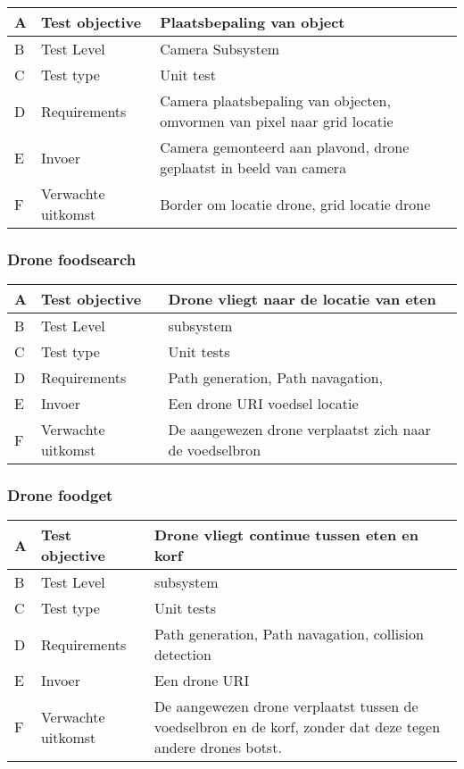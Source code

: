 \begin{table}[hbt!]
    \begin{tabular}[t]{|m{0.3cm}|m{3.2cm}|m{7.5cm}|}\hline
    A & Test objective & Plaatsbepaling van object \\ \hline
    B & Test Level & Camera Subsystem\\ \hline
    C & Test type & Unit test\\ \hline
    D & Requirements & Camera plaatsbepaling van objecten, omvormen van pixel naar grid locatie\\ \hline
    E & Invoer & Camera gemonteerd aan plavond, drone geplaatst in beeld van camera \\ \hline
    F & Verwachte uitkomst & Border om locatie drone, grid locatie drone\\ \hline
    \end{tabular}
\end{table}

\newpage

\subsubsection{Drone foodsearch}

\begin{table}[hbt!]
    \begin{tabular}[t]{|m{0.3cm}|m{3.2cm}|m{7.5cm}|}\hline
    A & Test objective & Drone vliegt naar de locatie van eten\\ \hline
    B & Test Level & subsystem\\ \hline
    C & Test type & Unit tests\\ \hline
    D & Requirements & Path generation, Path navagation, \\ \hline
    E & Invoer & Een drone URI voedsel locatie\\ \hline
    F & Verwachte uitkomst & De aangewezen drone verplaatst zich naar de voedselbron\\ \hline
    \end{tabular}
\end{table}

\subsubsection{Drone foodget}

\begin{table}[hbt!]
    \begin{tabular}[t]{|m{0.3cm}|m{3.2cm}|m{7.5cm}|}\hline
    A & Test objective & Drone vliegt continue tussen eten en korf\\ \hline
    B & Test Level & subsystem\\ \hline
    C & Test type & Unit tests\\ \hline
    D & Requirements & Path generation, Path navagation, collision detection\\ \hline
    E & Invoer & Een drone URI\\ \hline
    F & Verwachte uitkomst & De aangewezen drone verplaatst tussen de voedselbron en de korf,
     zonder dat deze tegen andere drones botst.\\ \hline
    \end{tabular}
\end{table}

